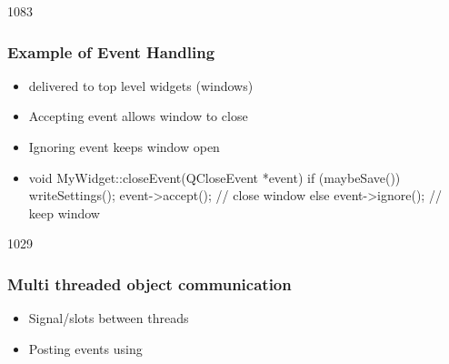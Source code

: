 \begin{slide}[fragile]{1083}
\frametitle{Example of Event Handling}

\begin{itemize}
\item {} delivered to top level widgets (windows)
\item Accepting event allows window to close
\item Ignoring event keeps window open
\item[]
\begin{cpp}
void MyWidget::closeEvent(QCloseEvent *event) {
  if (maybeSave()) {
    writeSettings();
    event->accept(); // close window
  } else {
    event->ignore(); // keep window
  }
}
\end{cpp}  
\end{itemize}
\end{slide}

\begin{slide}{1029}\frametitle{Multi threaded object communication}
  \begin{itemize}
  \item Signal/slots between threads
  \item Posting events using\\
  \end{itemize}
\end{slide}

